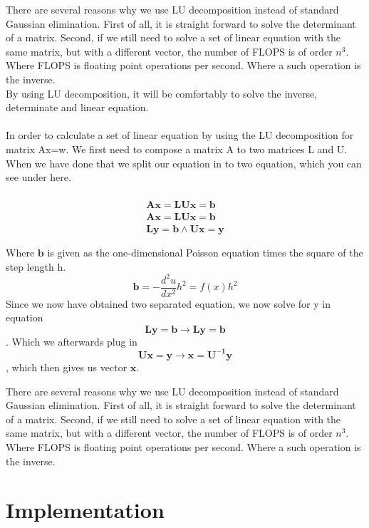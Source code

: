 \documentclass[norsk,a4paper,12pt]{article}
\begin{document}
There are several reasons why we use LU decomposition instead of standard Gaussian elimination. First of all, it is straight forward to solve the determinant of a matrix. Second, if we still need to solve a set of linear equation with the same matrix, but with a different vector, the number of FLOPS is of order $n^3$. Where FLOPS is floating point operations per second. Where a such operation is the inverse. 
\\
By using LU decomposition, it will be comfortably to solve the inverse, determinate and linear equation.         
\\
\\
In order to calculate a set of linear equation by using the LU decomposition for matrix Ax=w. We first need to compose a matrix A to two matrices L and U. When we have done that we split our equation in to two equation, which you can see under here.  
\\
\\
\begin{align*}
\mathbf{A}\mathbf{x}=\mathbf{L}\mathbf{U}\mathbf{x}=\mathbf{b}\\
\mathbf{A}\mathbf{x}=\mathbf{L}\mathbf{U}\mathbf{x}=\mathbf{b}\\
\mathbf{L}\mathbf{y}=\mathbf{b} \land  \mathbf{U}\mathbf{x}=\mathbf{y}\\
\end{align*}
\begin{align*}
\end{align*}
Where $\mathbf{b}$ is given as the one-dimensional Poisson equation times the square of the step length h. $$\mathbf{b}=-\frac{d^2u}{dx^2}h^2=f(x)h^2$$
Since we now have obtained two separated equation, we now solve for y in equation $$\mathbf{L}\mathbf{y}=\mathbf{b} \rightarrow \mathbf{L}\mathbf{y}=\mathbf{b} $$. Which we afterwards plug in  $$\mathbf{U}\mathbf{x}=\mathbf{y} \rightarrow \mathbf{x}=\mathbf{U^{-1}}\mathbf{y}$$, which then gives us vector $\mathbf{x}$.

There are several reasons why we use LU decomposition instead of standard Gaussian elimination. First of all, it is straight forward to solve the determinant of a matrix. Second, if we still need to solve a set of linear equation with the same matrix, but with a different vector, the number of FLOPS is of order $n^3$. Where FLOPS is floating point operations per second. Where a such operation is the inverse. 

\section{Implementation}
\end{document}
